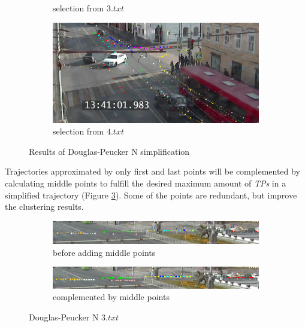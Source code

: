 \begin{figure}[!htb]
\begin{subfigure}[!htb]{0.48\textwidth}
		\caption{selection from $3.txt$}
	\end{subfigure}
	\hfill
	\begin{subfigure}[!htb]{0.48\textwidth}
		\centering{}
		\includegraphics[width=\textwidth]{images/rdp-n-long-4.png}
		\caption{selection from $4.txt$}
	\end{subfigure}
	
	\caption{Results of Douglas-Peucker N simplification}
	\label{fig:rdp-n-res}
\end{figure}

Trajectories approximated by only first and last points will be complemented by calculating middle points to fulfill the desired maximum amount of \textit{TPs} in a simplified trajectory (Figure \ref{fig:rdp_2_points_filled}). Some of the points are redundant, but improve the clustering results.

\begin{figure}[!htb]
	\centering
	\begin{subfigure}[!htb]{0.9\textwidth}
		\centering{}
		\includegraphics[width=\textwidth]{images/rdp-2-points.png}
		\caption{before adding middle points}
		\label{fig:rdp_2_points_only}
	\end{subfigure}
	\hfill
	\begin{subfigure}[!htb]{0.9\textwidth}
		\centering{}
		\includegraphics[width=\textwidth]{images/rdp-2-points-filled.png}
		\caption{complemented by middle points}
		\label{fig:rdp_2_points_filled}
	\end{subfigure}
	\caption{Douglas-Peucker N $3.txt$}
	\label{fig:rdp_2_points}
\end{figure}

